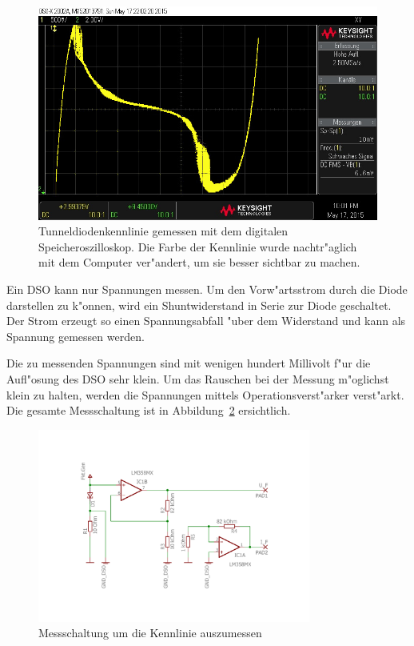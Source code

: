 \begin{refsection}
\begin{figure}	%
\centering
\includegraphics[width=\hsize]{tunneldiode/images/Kennlinie_DSO.jpg}
\caption{Tunneldiodenkennlinie gemessen mit dem digitalen Speicheroszilloskop. Die Farbe der Kennlinie wurde nachtr"aglich mit dem Computer ver"andert, um sie besser sichtbar zu machen.
\label{tunnel:KennlinieDSO}}
\end{figure}

Ein DSO kann nur Spannungen messen. 
Um den Vorw"artsstrom durch die Diode darstellen zu k"onnen, wird ein Shuntwiderstand in Serie zur Diode geschaltet. 
Der Strom erzeugt so einen Spannungsabfall "uber dem Widerstand und kann als Spannung gemessen werden.

Die zu messenden Spannungen sind mit wenigen hundert Millivolt f"ur die Aufl"osung des DSO sehr klein. 
Um das Rauschen bei der Messung m"oglichst klein zu halten, werden die Spannungen mittels Operationsverst"arker verst"arkt. 
Die gesamte Messschaltung ist in Abbildung~\ref{tunnel:Messschaltung} ersichtlich.

\begin{figure}	%
\centering
\includegraphics[width=0.8\textwidth]{tunneldiode/images/Messschaltung.pdf}
\caption{Messschaltung um die Kennlinie auszumessen
\label{tunnel:Messschaltung}}
\end{figure}


\end{refsection}
